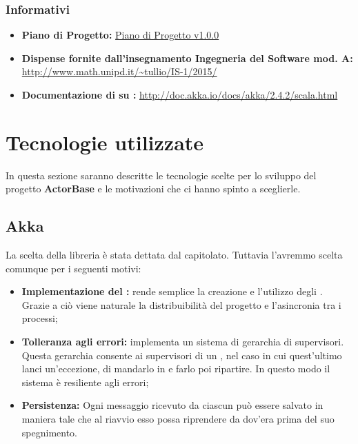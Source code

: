 \documentclass{scalatekids-article}
\begin{document}
\subsubsection{Informativi}
\begin{itemize}
\item\textbf{Piano di Progetto:} \href{run:./PianoDiProgetto\_v1.0.0.pdf}{Piano di Progetto v1.0.0}
\item\textbf{Dispense fornite dall'insegnamento Ingegneria del Software mod. A:}\\
  \url{http://www.math.unipd.it/~tullio/IS-1/2015/}
\item\textbf{Documentazione di  su :}
  \url{http://doc.akka.io/docs/akka/2.4.2/scala.html}
\end{itemize}
\newpage
\section{Tecnologie utilizzate}
In questa sezione saranno descritte le tecnologie scelte per lo sviluppo del progetto \textbf{ActorBase} e le motivazioni che ci hanno spinto a sceglierle.
\subsection{Akka}
La scelta della libreria  è stata dettata dal capitolato. Tuttavia l'avremmo scelta comunque per i seguenti motivi:
\begin{itemize}
\item\textbf{Implementazione del :}  rende semplice la creazione e l'utilizzo degli . Grazie a ciò viene naturale la distribuibilità del progetto e l'asincronia tra i processi;
\item\textbf{Tolleranza agli errori:}  implementa un sistema di gerarchia di supervisori. Questa gerarchia consente ai supervisori di un , nel caso in cui quest'ultimo lanci un'eccezione, di mandarlo in  e farlo poi ripartire. In questo modo il sistema è resiliente agli errori;
\item\textbf{Persistenza:} Ogni messaggio ricevuto da ciascun  può essere salvato in maniera tale che al riavvio esso possa riprendere da dov'era prima del suo spegnimento.
\end{itemize}
\end{document}
